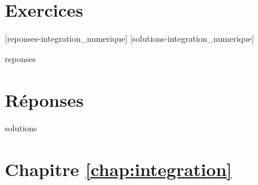 \section{Exercices}
\label{sec:integration:exercices}


[reponses-integration_numerique]
[solutions-integration_numerique]

\begin{Filesave}{reponses}
\bigskip
\section*{Réponses}

\end{Filesave}

\begin{Filesave}{solutions}
\section*{Chapitre \ref{chap:integration}}

\end{Filesave}


